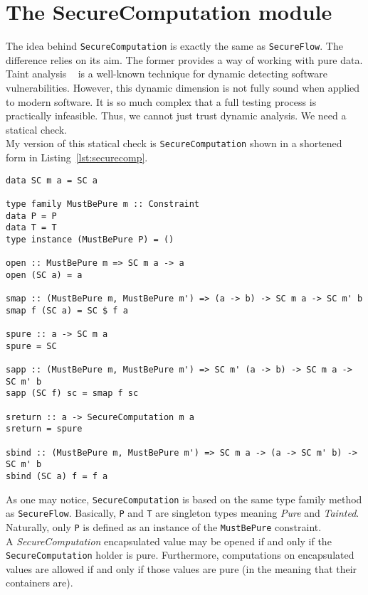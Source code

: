 \section{The SecureComputation module}\label{sec:computation}
The idea behind \texttt{SecureComputation} is exactly the same as \texttt{SecureFlow}. The difference relies on its aim. The former provides a way of working with pure data. \\
Taint analysis \cite{schwartz2010all}~\cite{newsome2005dynamic} is a well-known technique for dynamic detecting software vulnerabilities. However, this dynamic dimension is not fully sound when applied to modern software. It is so much complex that a full testing process is practically infeasible. Thus, we cannot just trust dynamic analysis. We need a statical check. \\
My version of this statical check is \texttt{SecureComputation} shown in a shortened form in Listing~\ref{lst:securecomp}.
\begin{lstlisting}[caption={SecureComputation module}, label={lst:securecomp}, breaklines=true]
data SC m a = SC a

type family MustBePure m :: Constraint
data P = P
data T = T
type instance (MustBePure P) = ()

open :: MustBePure m => SC m a -> a
open (SC a) = a

smap :: (MustBePure m, MustBePure m') => (a -> b) -> SC m a -> SC m' b
smap f (SC a) = SC $ f a

spure :: a -> SC m a
spure = SC

sapp :: (MustBePure m, MustBePure m') => SC m' (a -> b) -> SC m a -> SC m' b
sapp (SC f) sc = smap f sc

sreturn :: a -> SecureComputation m a
sreturn = spure

sbind :: (MustBePure m, MustBePure m') => SC m a -> (a -> SC m' b) -> SC m' b
sbind (SC a) f = f a
\end{lstlisting}
As one may notice, \texttt{SecureComputation} is based on the same type family method as \texttt{SecureFlow}. Basically, \texttt{P} and \texttt{T} are singleton types meaning \textit{Pure} and \textit{Tainted}. Naturally, only \texttt{P} is defined as an instance of the \texttt{MustBePure} constraint. \\
A \textit{SecureComputation} encapsulated value may be opened if and only if the \texttt{SecureComputation} holder is pure. Furthermore, computations on encapsulated values are allowed if and only if those values are pure (in the meaning that their containers are). \\
